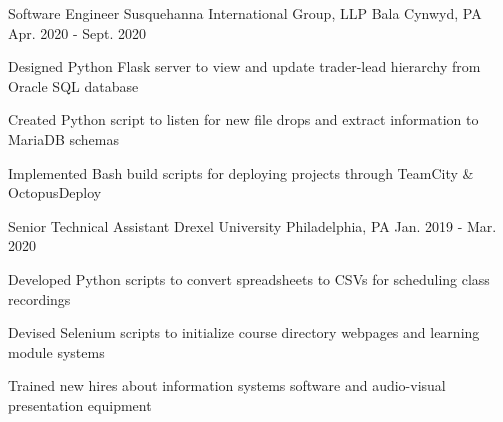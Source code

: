 

\begin{cventries}

  \cventry
  {Software Engineer} %
  {Susquehanna International Group, LLP} %
  {Bala Cynwyd, PA} %
  {Apr. 2020 - Sept. 2020} %
  {
    \begin{cvitems} %
      \item {Designed Python Flask server to view and update trader-lead hierarchy from Oracle SQL database}
      \item {Created Python script to listen for new file drops and extract information to MariaDB schemas}
      \item {Implemented Bash build scripts for deploying projects through TeamCity \& OctopusDeploy}
    \end{cvitems}
  }

  \cventry
  {Senior Technical Assistant} %
  {Drexel University} %
  {Philadelphia, PA} %
  {Jan. 2019 - Mar. 2020} %
  {
    \begin{cvitems} %
      \item {Developed Python scripts to convert spreadsheets to CSVs for scheduling class recordings}
      \item {Devised Selenium scripts to initialize course directory webpages and learning module systems}
      \item {Trained new hires about information systems software and audio-visual presentation equipment}
    \end{cvitems}
  }

\end{cventries}
